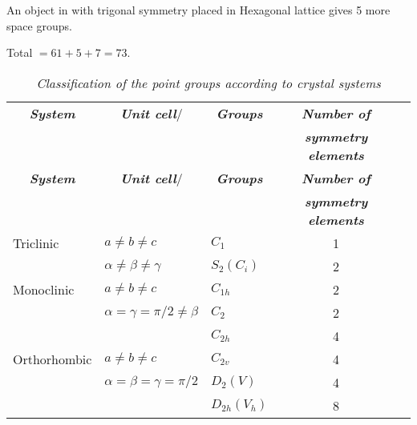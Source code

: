 An object in with trigonal symmetry placed in Hexagonal lattice gives 5 more space groups.

Total $=61+5+7=73$.
\begin{landscape}
{\small
\renewcommand{\arraystretch}{1.05}
\begin{longtable}{l|l|l|c|l}
\captionsetup{justification=centering}
\caption{\em Classification of the point groups according to crystal systems}\\
\hline
\multicolumn{1}{c|}{{\bf\em System}} & \multicolumn{1}{c|}{{\it\bfseries Unit cell}/} & \multicolumn{1}{c|}{{\it\bfseries Groups}} & \multicolumn{1}{c|}{{\it\bfseries Number of}} & \multicolumn{1}{c}{{\color{red}{\it\bfseries No. of}}}\\
\multicolumn{1}{c|}{{\color{red}{\it\bfseries additional orientations}}} & \multicolumn{1}{c|}{{\color{red}{\it\bfseries Bravais Lattice}}} & & \multicolumn{1}{c|}{{\it\bfseries symmetry elements}} & \multicolumn{1}{c}{{\color{red}{\it\bfseries same group}}}\\
\hline
\endfirsthead
\hline
\multicolumn{1}{c|}{{\bf\em System}} & \multicolumn{1}{c|}{{\it\bfseries Unit cell}/} & \multicolumn{1}{c|}{{\it\bfseries Groups}} & \multicolumn{1}{c|}{{\it\bfseries Number of}} & \multicolumn{1}{c}{{\color{red}{\it\bfseries No. of}}}\\
\multicolumn{1}{c|}{{\color{red}{\it\bfseries additional orientations}}} & \multicolumn{1}{c|}{{\color{red}{\it\bfseries Bravais Lattice}}} & & \multicolumn{1}{c|}{{\it\bfseries symmetry elements}} & \multicolumn{1}{c}{{\color{red}{\it\bfseries same group}}}\\
\hline
\endhead
\hline
\endfoot
\endlastfoot
Triclinic & $a\neq b\neq c$\qquad \color{red}{1} & $C_{1}$ & 1 & \color{red}{$2\times 1=2$}\\
          & $\alpha\neq \beta\neq \gamma$ & $S_{2}(C_{i})$ & 2 & \\
\hline
Monoclinic & $a\neq b\neq c$ & $C_{1h}$ & 2 & \color{red}{$3\times 2=6$}\\
           & $\alpha=\gamma=\pi/2\neq\beta$\qquad \color{red}{2} & $C_{2}$ & 2 & \\
           & & $C_{2h}$ & 4 & \\
\hline
Orthorhombic & $a\neq b\neq c$ & $C_{2v}$ & 4 & \color{red}{$3\times 4=12$}\\
\color{red}{1 different orientation} & $\alpha=\beta=\gamma=\pi/2$\qquad \color{red}{4} & $D_{2}(V)$ & 4 & \\
                                     && $D_{2h}(V_{h})$ & 8 & \\

\end{longtable}}
\end{landscape}
